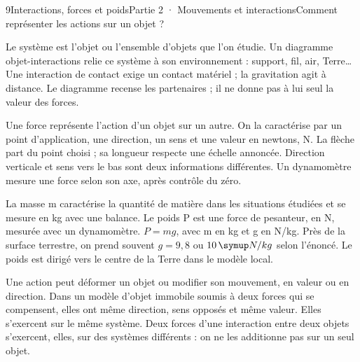 \begin{ouverture}[college2]{9}{Interactions, forces et poids}{Partie 2 · Mouvements et interactions}{Comment représenter les actions sur un objet ?}
\end{ouverture}
\label{ess-9}
Le système est l’objet ou l’ensemble d’objets que l’on étudie. Un diagramme objet-interactions relie ce système à son environnement : support, fil, air, Terre… Une interaction de contact exige un contact matériel ; la gravitation agit à distance. Le diagramme recense les partenaires ; il ne donne pas à lui seul la valeur des forces.\par
{}
Une force représente l’action d’un objet sur un autre. On la caractérise par un point d’application, une direction, un sens et une valeur en newtons, N. La flèche part du point choisi ; sa longueur respecte une échelle annoncée. Direction verticale et sens vers le bas sont deux informations différentes. Un dynamomètre mesure une force selon son axe, après contrôle du zéro.\par
\clearpage
{}
La masse m caractérise la quantité de matière dans les situations étudiées et se mesure en kg avec une balance. Le poids P est une force de pesanteur, en N, mesurée avec un dynamomètre. $P=mg$, avec m en kg et g en N/kg. Près de la surface terrestre, on prend souvent $g=9{,}8$ ou $10\unite{N/kg}$ selon l’énoncé. Le poids est dirigé vers le centre de la Terre dans le modèle local.\par
{}
Une action peut déformer un objet ou modifier son mouvement, en valeur ou en direction. Dans un modèle d’objet immobile soumis à deux forces qui se compensent, elles ont même direction, sens opposés et même valeur. Elles s’exercent sur le même système. Deux forces d’une interaction entre deux objets s’exercent, elles, sur des systèmes différents : on ne les additionne pas sur un seul objet.\par
